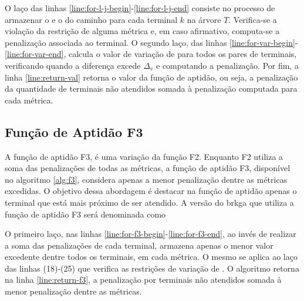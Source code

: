 O laço  das linhas  \eqref{line:for-l-j-begin}-\eqref{line:for-l-j-end} consiste
no processo de armazenar o {\delay} e  o {\jitter} do caminho para cada terminal
$k$ na árvore $T$.  Verifica-se a violação da restrição de  alguma métrica e, em
caso afirmativo, computa-se a penalização associada ao terminal. O segundo laço,
das linhas \eqref{line:for-var-begin}-\eqref{line:for-var-end},  calcula o valor
de variação de  {\delay} para todos os pares de  terminais, verificando quando a
diferença  excede  $\Delta_v$ e  computando  a  penalização.  Por fim,  a  linha
\eqref{line:return-val}  retorna  o valor  da  função  de  aptidão, ou  seja,  a
penalização  da  quantidade de  terminais  não  atendidos somada  à  penalização
computada para cada métrica.

\subsection{Função de Aptidão F3} \label{subsec:brkga-f3}

A função de aptidão F3, é uma variação  da função F2. Enquanto F2 utiliza a soma
das penalizações  de todas as  métricas, a função  de aptidão F3,  disponível no
algoritmo \ref{alg:f3}, considera apenas a  menor penalização dentre as métricas
excedidas. O objetivo  dessa abordagem é destacar na função  de aptidão apenas o
terminal que  está mais  próximo de  ser atendido. A  versão do  \gls{brkga} que
utiliza a função de aptidão F3 será denominada como {\bftres}

O primeiro  laço, nas  linhas \eqref{line:for-f3-begin}-\eqref{line:for-f3-end},
ao invés de realizar a soma das penalizações de cada terminal, armazena apenas o
menor valor  excedente dentre todos  os terminais, em  cada métrica. O  mesmo se
aplica ao  laço das linhas (18)-(25)  que verifica as restrições  de variação de
{\delay}. O algoritmo retorna na linha \eqref{line:return-f3}, a penalização por
terminais não atendidos somada à menor penalização dentre as métricas.

